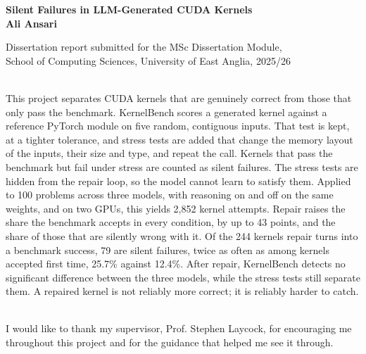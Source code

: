 \documentclass[12pt]{article}
\begin{document}
\begin{center}
\vspace*{4cm}
	{\Huge \bf{ Silent Failures in LLM-Generated CUDA Kernels } }\\
\vspace{2.5cm}
	{\LARGE \bf{ Ali Ansari } }\\
\vspace*{12cm}

Dissertation report submitted for the MSc Dissertation Module, \\
School of Computing Sciences, University of East Anglia, 2025/26
\end{center}

\newpage

\vspace{5cm}
\\
This project separates CUDA kernels that are genuinely correct from those that
only pass the benchmark. KernelBench scores a generated kernel against a
reference PyTorch module on five random, contiguous inputs. That test is kept, at a tighter tolerance, and
stress tests are added that change the memory layout of the inputs, their size
and type, and repeat the call. Kernels that pass the benchmark but fail
under stress are counted as silent failures. The stress tests are hidden from
the repair loop, so the model cannot learn to satisfy them. Applied to 100 problems across
three models, with reasoning on and off on the same weights, and on two GPUs,
this yields 2,852 kernel attempts. Repair raises the
share the benchmark accepts in every condition, by up to 43 points, and the
share of those that are silently wrong with it.
Of the 244 kernels repair turns into a benchmark success, 79 are silent
failures, twice as often as among kernels accepted first time, 25.7\% against
12.4\%. After repair, KernelBench detects no
significant difference between the three models, while the stress tests still
separate them. A repaired kernel is not reliably more correct; it is reliably
harder to catch.

\newpage
\vspace{5cm}

\\
I would like to thank my supervisor, Prof. Stephen Laycock, for encouraging me
throughout this project and for the guidance that helped me see it through.
\end{document}
